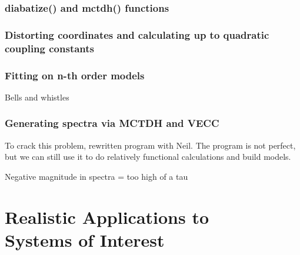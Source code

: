 

\newpage


\subsection{diabatize() and mctdh() functions}
    
\subsection{Distorting coordinates and calculating up to quadratic coupling constants}

\subsection{Fitting on n-th order models}
Bells and whistles

\subsection{Generating spectra via MCTDH and VECC}
To crack this problem, rewritten program with Neil. The program is not perfect, but we can still use it to do relatively functional calculations and build models.

Negative magnitude in spectra = too high of a tau

\newpage




\chapter{Realistic Applications to \\ Systems of Interest}


